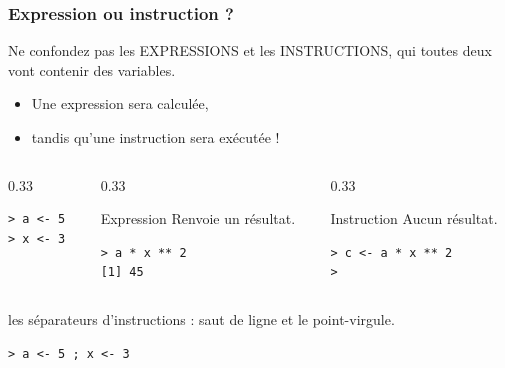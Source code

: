 \documentclass[10pt]{beamer}
\begin{document}

\begin{frame}[fragile]
  \frametitle{Expression ou instruction ?}
  Ne confondez pas les EXPRESSIONS et les INSTRUCTIONS, qui toutes deux vont contenir des variables.
  \begin{itemize}
  \item Une expression sera \alert{calculée},
  \item tandis qu'une instruction sera \alert{exécutée} !
  \end{itemize}



\begin{columns}[b]
\begin{column}{0.33\textwidth}
    \begin{lstlisting}
> a <- 5
> x <- 3
\end{lstlisting}

\end{column}

\begin{column}{0.33\textwidth}
  \begin{alertblock}{Expression}
    Renvoie un résultat.
    \begin{lstlisting}
> a * x ** 2
[1] 45
    \end{lstlisting}

  \end{alertblock}
\end{column}
\begin{column}{0.33\textwidth}
  \begin{alertblock}{Instruction}
    Aucun résultat.
    \begin{lstlisting}
> c <- a * x ** 2
>
    \end{lstlisting}
  \end{alertblock}
\end{column}
\end{columns}

\begin{block}{les séparateurs d'instructions : saut de ligne et le point-virgule.}
  \begin{lstlisting}[style=block]
> a <- 5 ; x <- 3
\end{lstlisting}

\end{block}
\end{frame}
\end{document}
